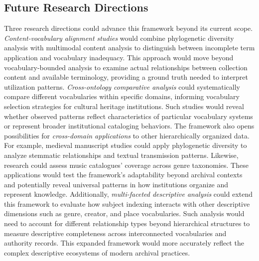 \documentclass[final]{anthology-ch}
\begin{document}
\subsection{Future Research Directions}
Three research directions could advance this framework beyond its current scope. \textit{Content-vocabulary alignment studies} would combine phylogenetic diversity analysis with multimodal content analysis to distinguish between incomplete term application and vocabulary inadequacy. This approach would move beyond vocabulary-bounded analysis to examine actual relationships between collection content and available terminology, providing a ground truth needed to interpret utilization patterns. \textit{Cross-ontology comparative analysis} could systematically compare different vocabularies within specific domains, informing vocabulary selection strategies for cultural heritage institutions. Such studies would reveal whether observed patterns reflect characteristics of particular vocabulary systems or represent broader institutional cataloging behaviors.
The framework also opens possibilities for \textit{cross-domain applications} to other hierarchically organized data. For example, medieval manuscript studies could apply phylogenetic diversity to analyze stemmatic relationships and textual transmission patterns. Likewise, research could assess music catalogues' coverage across genre taxonomies. These applications would test the framework's adaptability beyond archival contexts and potentially reveal universal patterns in how institutions organize and represent knowledge.
Additionally, \textit{multi-faceted descriptive analysis} could extend this framework to evaluate how subject indexing interacts with other descriptive dimensions such as genre, creator, and place vocabularies. Such analysis would need to account for different relationship types beyond hierarchical structures to measure descriptive completeness across interconnected vocabularies and authority records. This expanded framework would more accurately reflect the complex descriptive ecosystems of modern archival practices.
\end{document}
